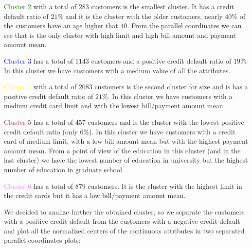 \smallskip

\textcolor{green}{Cluster 2} with a total of $283$ customers is the smallest cluster. It has a credit default ratio of $21\%$ and it is the cluster with the older customers, nearly $40\%$ of the customers have an age higher that $40$. From the parallel coordinates we can see that is the only cluster with high limit and high bill amount and payment amount mean. 

\medskip

\textcolor{blue}{Cluster 3} has a total of $1143$ customers and a positive credit default ratio of $19\%$. In this cluster we have customers with a medium value of all the attributes.

\medskip

\textcolor{yellow}{Cluster 4} with a total of $2083$ customers is the second cluster for size and is has a positive credit default ratio of $21\%$. In this cluster we have customers with a medium credit card limit and with the lowest bill/payment amount mean.

\medskip

\textcolor{brown}{Cluster 5} has a total of $457$ customers and is the cluster with the lowest positive credit default ratio (only $6\%$). In this cluster we have customers with a credit card of medium limit, with a low bill amount mean but with the highest payment amount mean. From a point of view of the education in this cluster (and in the last cluster) we have the lowest number of education in university but the highest number of education in graduate school.

\medskip

\textcolor{violet}{Cluster 6} has a total of $879$ customers. It is the cluster with the highest limit in the credit cards but it has a low bill/payment amount mean.

\medskip

We decided to analize further the obtained cluster, so we separate the customers with a positive credit default from the customers with a negative credit default and plot all the normalized centers of the continuous attributes in two separated parallel coordinates plots: 

